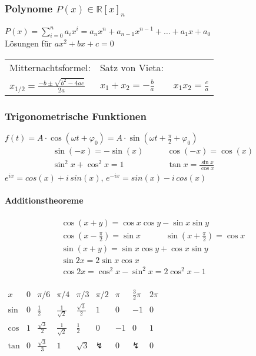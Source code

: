 \documentclass[6pt,a4paper]{scrartcl}
\newcommand{\enbrace}[1]{\ensuremath{\left(#1\right)}}
\begin{document}
\begin{multicols}{4}
\subsubsection{Polynome $P(x)\in\mathbb R[x]_n$}
$P(x)=\sum_{i=0}^n a_ix^i=a_n x^n+a_{n-1} x^{n-1}+\dotsc+a_1x+a_0$ \\
Lösungen für $ax^2+bx+c=0$ \\
\begin{tabular}{l|l}
Mitternachtsformel:  &  Satz von Vieta:\\
$x_{1/2}=\frac{-b\pm\sqrt{b^2-4ac}}{2a}$  \quad & \quad   $x_1 + x_2 = - \frac{b}{a} \qquad x_1 x_2 = \frac{c}{a}$
\end{tabular}

\subsubsection{Trigonometrische Funktionen}
$f(t)=A\cdot \cos(\omega t + \varphi_0)=A\cdot \sin(\omega t + \frac{\pi}{2}+ \varphi_0)$
\begin{eqnarray*}
	\sin (-x) = -\sin (x)  \quad & \quad \cos (-x) = \cos (x) \\
	\sin^2 x + \cos^2 x = 1  \quad & \quad \tan x = \frac{\sin x}{\cos x}
\end{eqnarray*}
$e^{ix}=cos(x)+i\,sin(x)$, $e^{-ix}=sin(x)-i\,cos(x)$

\paragraph{Additionstheoreme} %
\label{par:additionstheoreme}
 \begin{eqnarray*}
 	\cos (x + y) = \cos x \cos y - \sin x \sin y \\
	\cos \enbrace{x - \frac{\pi}{2}} = \sin x \qquad \quad \sin \enbrace{x + \frac{\pi}{2}} = \cos x \\
    \sin \enbrace{x + y} = \sin x \cos y + \cos x \sin y \\
	\sin 2x = 2 \sin x \cos x        \\
	\cos 2x = \cos^2 x - \sin^2 x = 2\cos^2 x - 1\\
 \end{eqnarray*}

$\begin{array}{c|c|c|c|c|c|c|c|c}
x & 0 & \pi / 6 & \pi / 4 & \pi / 3 & \pi / 2 & \pi & \frac{3}{2}\pi & 2 \pi \\ \hline
\sin & 0 & \frac{1}{2} & \frac{1}{\sqrt{2}} & \frac{\sqrt 3}{2} & 1 & 0 & -1 & 0 \\
\cos & 1 & \frac{\sqrt 3}{2} & \frac{1}{\sqrt 2} & \frac{1}{2} & 0 & -1 & 0 & 1 \\     
\tan & 0 & \frac{\sqrt{3}}{3}&	1				 &	\sqrt{3} & \lightning & 0 & \lightning & 0\\
\end{array}$



\end{multicols}
\end{document}
